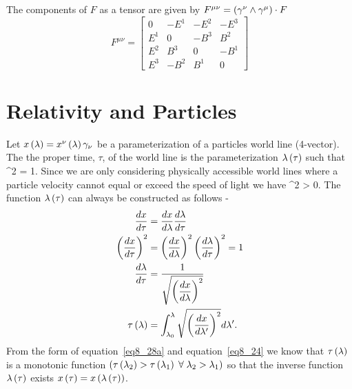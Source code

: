 The components of $F$ as a tensor are given by $F^{\mu\nu} =\left ( {\gamma^{\nu}\wedge\gamma^{\mu}} \right )\cdot F$
\begin{equation}
F^{\mu\nu} = \left [ 
\begin{array}{cccc}  
0 & - {E^{1}} & - {E^{2}} & - {E^{3}} \\ 
{E^{1}} & 0 & - {B^{3}} & {B^{2}} \\ 
{E^{2}} & {B^{3}} & 0 & - {B^{1}} \\ 
{E^{3}} & - {B^{2}} & {B^{1}} & 0
\end{array} 
\right ] 
\end{equation}
\section{Relativity and Particles}\label{sect8_2}
Let ${x}\left ( {\lambda} \right ) = {x^{\nu}}\left ( {\lambda} \right )\gamma_{\nu}$ be a parameterization of a particles world line (4-vector).  
The the proper time, $\tau$, of the world line is the parameterization ${\lambda}\left ( {\tau} \right )$ such that
\be
	^{2} = 1.
\ee
Since we are only considering physically accessible world lines where a particle velocity cannot equal or exceed the 
speed of light we have
\be\label{eq8_24}
	^{2} > 0.
\ee
The function ${\lambda}\left ( {\tau} \right )$ can always be constructed as follows -
\begin{align}
	\displaystyle\frac{d{x}}{d{\tau}} &= \displaystyle\frac{d{x}}{d{\lambda}}\displaystyle\frac{d{\lambda}}{d{\tau}} \\
	\left ( {\displaystyle\frac{d{x}}{d{\tau}}} \right )^{2} &= \left ( {\displaystyle\frac{d{x}}{d{\lambda}}} \right )^{2}\left ( {\displaystyle\frac{d{\lambda}}{d{\tau}}} \right )^{2} = 1 \\
	\displaystyle\frac{d{\lambda}}{d{\tau}} &= \displaystyle\frac{1}{\sqrt{\left ( {\displaystyle\frac{d{x}}{d{\lambda}}} \right )^{2}}} \\
	{\tau}\left ( {\lambda} \right ) &= \int_{\lambda_{0}}^{\lambda}\sqrt{\left ( {\displaystyle\frac{d{x}}{d{\lambda'}}} \right )^{2}} d\lambda'. \label{eq8_28a}
\end{align}
From the form of equation~\ref{eq8_28a} and equation~\ref{eq8_24} we know that ${\tau}\left ( {\lambda} \right )$ is a monotonic function 
$\left ( {{\tau}\left ( {\lambda_{2}} \right )>{\tau}\left ( {\lambda_{1}} \right )\;\forall\;\lambda_{2}>\lambda_{1}} \right )$ so that the inverse function
${\lambda}\left ( {\tau} \right )$ exists ${x}\left ( {\tau} \right ) = {x}\left ( {{\lambda}\left ( {\tau} \right )} \right )$.

